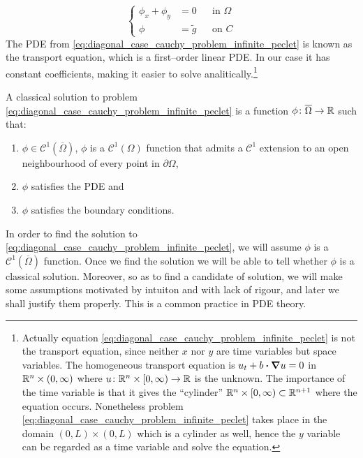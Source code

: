 \begin{equation} \label{eq:diagonal_case_cauchy_problem_infinite_peclet}
	\left\{
	\begin{aligned}
		\phi_x + \phi_y &= 0 &
		&\text{in } \Omega \\
		\phi &= \tilde{g} &
		&\text{on } C
	\end{aligned}
	\right.
\end{equation}
The PDE from \eqref{eq:diagonal_case_cauchy_problem_infinite_peclet} is known as
the transport equation, which is a first--order linear PDE. In our case it has
constant coefficients, making it easier to solve analitically.\footnote{Actually
equation \eqref{eq:diagonal_case_cauchy_problem_infinite_peclet} is not the
transport equation, since neither $x$ nor $y$ are time variables but space
variables. The homogeneous transport equation is $u_t + b \vdot \grad{u} = 0$ in
$\mathbb{R}^n \times (0,\infty)$ where $u \colon \mathbb{R}^n \times [0,\infty) \to \mathbb{R}$
is the unknown. The importance of the time variable is that it gives the
``cylinder'' $\mathbb{R}^n \times [0,\infty) \subset \mathbb{R}^{n+1}$ where the equation
occurs. Nonetheless problem
\eqref{eq:diagonal_case_cauchy_problem_infinite_peclet} takes place in the
domain $(0, L) \times (0, L)$ which is a cylinder as well, hence the $y$
variable can be regarded as a time variable and solve the equation.}

\begin{definition*}
	A classical solution to problem
	\eqref{eq:diagonal_case_cauchy_problem_infinite_peclet} is a function $\phi
	\colon \overline{\Omega} \rightarrow \mathbb{R}$ such that:
	\begin{enumerate}[label={(\roman*)}, topsep=0pt]
		\item $\phi \in \mathcal{C}^1(\overline{\Omega})$, \ie $\phi$ is a
		$\mathcal{C}^1(\Omega)$ function that admits a $\mathcal{C}^1$ extension
		to an open neighbourhood of every point in $\partial \Omega$,
		\item $\phi$ satisfies the PDE and
		\item $\phi$ satisfies the boundary conditions.
	\end{enumerate}
\end{definition*}
\noindent
In order to find the solution to
\eqref{eq:diagonal_case_cauchy_problem_infinite_peclet}, we will assume $\phi$
is a $\mathcal{C}^1(\overline{\Omega})$ function. Once we find the solution we
will be able to tell whether $\phi$ is a classical solution. Moreover, so as to
find a candidate of solution, we will make some assumptions motivated by
intuiton and with lack of rigour, and later we shall justify them properly. This
is a common practice in PDE theory.

